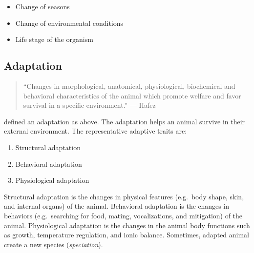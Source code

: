 \documentclass[]{book}
\providecommand{\tightlist}{%
  \setlength{\itemsep}{0pt}\setlength{\parskip}{0pt}}
\begin{document}
\begin{itemize}
\tightlist
\item
  Change of seasons
\item
  Change of environmental conditions
\item
  Life stage of the organism
\end{itemize}

\subsection{Adaptation}\label{adaptation}

\begin{quote}
``Changes in morphological, anatomical, physiological, biochemical and
behavioral characteristics of the animal which promote welfare and favor
survival in a specific environment.'' --- Hafez
\end{quote}

\citet{hafez1968adaptation} defined an adaptation as above. The
adaptation helps an animal survive in their external environment. The
representative adaptive traits are:

\begin{enumerate}
\def\labelenumi{\arabic{enumi}.}
\tightlist
\item
  Structural adaptation
\item
  Behavioral adaptation
\item
  Physiological adaptation
\end{enumerate}

Structural adaptation is the changes in physical features (e.g.~body
shape, skin, and internal organs) of the animal. Behavioral adaptation
is the changes in behaviors (e.g.~searching for food, mating,
vocalizations, and mitigation) of the animal. Physiological adaptation
is the changes in the animal body functions such as growth, temperature
regulation, and ionic balance. Sometimes, adapted animal create a new
species (\emph{speciation}).
\end{document}
